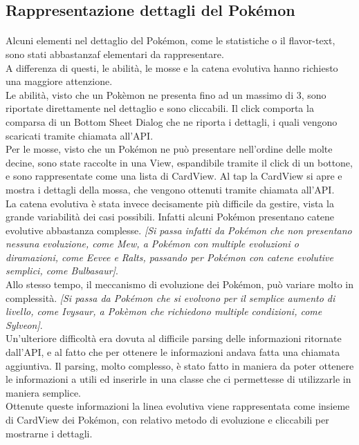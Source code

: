 \documentclass[a4paper,11pt]{article}
\begin{document}
  				\subsection{Rappresentazione dettagli del Pokémon}
  					\paragraph{}
  						Alcuni elementi nel dettaglio del Pokémon, come le statistiche o il flavor-text, sono stati abbastanzaf elementari da rappresentare.\\
  						A differenza di questi, le abilità, le mosse e la catena evolutiva hanno richiesto una maggiore attenzione.\\
  						Le abilità, visto che un Pokèmon ne presenta fino ad un massimo di 3, sono riportate direttamente nel dettaglio e sono cliccabili. Il click comporta la comparsa di un Bottom Sheet Dialog che ne riporta i dettagli, i quali vengono scaricati tramite chiamata all’API.\\
  						Per le mosse, visto che un Pokémon ne può presentare nell’ordine delle molte decine, sono state raccolte in una View, espandibile tramite il click di un bottone, e sono rappresentate come una lista di CardView. Al tap la CardView si apre e mostra i dettagli della mossa, che vengono ottenuti tramite chiamata all’API.\\
  						La catena evolutiva è stata invece decisamente più difficile da gestire, vista la grande variabilità dei casi possibili. Infatti alcuni Pokémon presentano catene evolutive abbastanza complesse. \textit{[Si passa infatti da Pokémon che non presentano nessuna evoluzione, come Mew, a Pokémon con multiple evoluzioni o diramazioni, come Eevee e Ralts, passando per Pokémon con catene evolutive semplici, come Bulbasaur]}.\\
  						 Allo stesso tempo, il meccanismo di evoluzione dei Pokémon, può variare molto in complessità. \textit{[Si passa da Pokémon che si evolvono per il semplice aumento di livello, come Ivysaur, a Pokèmon che richiedono multiple condizioni, come Sylveon]}.\\
  						 Un’ulteriore difficoltà era dovuta al difficile parsing delle informazioni ritornate dall’API, e al fatto che per ottenere le informazioni andava fatta una chiamata aggiuntiva. Il parsing, molto complesso, è stato fatto in maniera da poter ottenere le informazioni a utili ed inserirle in una classe che ci permettesse di utilizzarle in maniera semplice.\\
  						 Ottenute queste informazioni la linea evolutiva viene rappresentata come insieme di CardView dei Pokémon, con relativo metodo di evoluzione e cliccabili per mostrarne i dettagli.
\end{document}
